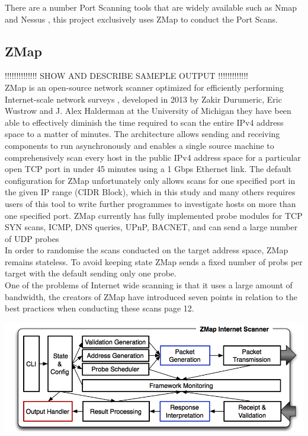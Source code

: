 \documentclass[a4wide,leqno,12pt]{report}
\begin{document}
There are a number Port Scanning tools that are widely available such as Nmap \cite{lyon2009nmap} and Nessus \cite{beale2004nessus}, this project exclusively uses ZMap \cite{durumeric2013zmap} to conduct the Port Scans.
\subsection{ZMap}

!!!!!!!!!!!!!! SHOW AND DESCRIBE SAMEPLE OUTPUT !!!!!!!!!!!!!\\


ZMap is an open-source network scanner optimized for efficiently performing
Internet-scale network surveys \cite{durumeric2013zmap}, developed in 2013 by Zakir Durumeric, Eric Wustrow and J. Alex Halderman at the University of Michigan they have been able to effectively diminish the time required to scan the entire IPv4 address space to a matter of minutes. The architecture allows sending and receiving components
to run asynchronously and enables a single source machine to comprehensively scan every host in the public IPv4
address space for a particular open TCP port in under 45 minutes using a 1 Gbps Ethernet link\cite{durumeric2013zmap}. The default configuration for ZMap unfortunately only allows scans for one specified port in the given IP range (CIDR Block)\cite{fuller1993classless}, which in this study and many others requires users of this tool to write further programmes to investigate hosts on more than one specified port. ZMap currently has fully implemented probe modules for TCP SYN scans, ICMP, DNS queries, UPnP, BACNET, and can send a large number of UDP probes \cite{zmapGithub}\\


In order to randomise the scans conducted on the target address space, ZMap remains stateless. To avoid keeping state ZMap sends a fixed number of probs per target with the default sending only one probe.\cite{durumeric2013zmap}\\

One of the problems of Internet wide scanning is that it uses a large amount of bandwidth,
the creators of ZMap have introduced seven points in relation to the best practices when conducting these scans\cite{durumeric2013zmap} page 12. \\


\begin{center}
\centering
\includegraphics[scale=.4]{images/zmap_architecture.png}
\end{center}
\end{document}
